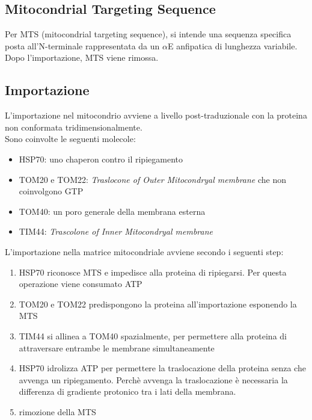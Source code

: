     \subsection{Mitocondrial Targeting Sequence}
        Per MTS (mitocondrial targeting sequence), si intende una sequenza specifica posta all'N-terminale rappresentata da un $\alpha$E anfipatica di lunghezza variabile. 
        Dopo l'importazione, MTS viene rimossa.
        
    \subsection{Importazione}
        L'importazione nel mitocondrio avviene a livello post-traduzionale con la proteina non conformata tridimensionalmente.\\
        Sono coinvolte le seguenti molecole:
        \begin{itemize}
            \item HSP70: uno chaperon contro il ripiegamento
            \item TOM20 e TOM22: \textit{Traslocone of Outer Mitocondryal membrane} che non coinvolgono GTP
            \item TOM40: un poro generale della membrana esterna
            \item TIM44: \textit{Trascolone of Inner Mitocondryal membrane}
        \end{itemize}
        L'importazione nella matrice mitocondriale avviene secondo i seguenti step:
        \begin{enumerate}
            \item HSP70 riconosce MTS e impedisce alla proteina di ripiegarsi. Per questa operazione viene consumato ATP
            \item TOM20 e TOM22 predispongono la proteina all'importazione esponendo la MTS
            \item TIM44 si allinea a TOM40 spazialmente, per permettere alla proteina di attraversare entrambe le membrane simultaneamente
            \item HSP70 idrolizza ATP per permettere la traslocazione della proteina senza che avvenga un ripiegamento. Perchè avvenga la traslocazione è necessaria la differenza di gradiente protonico tra i lati della membrana.
            \item rimozione della MTS
        \end{enumerate}
